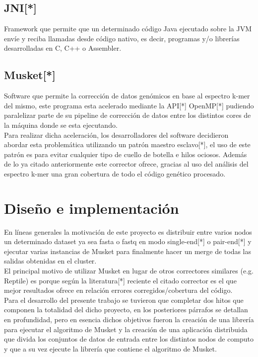 \documentclass[conference]{IEEEtran}
\begin{document}
\subsection{JNI[*]}
Framework que permite que un determinado código Java ejecutado sobre la JVM envíe y reciba llamadas desde código nativo, es decir, programas y/o librerías desarrolladas en C, C++ o Assembler.

\subsection{Musket[*]}
Software que permite la corrección de datos genómicos en base al espectro k-mer del mismo, este programa esta acelerado mediante la API[*] OpenMP[*] pudiendo paralelizar parte de su pipeline de corrección de datos entre los distintos cores de la máquina donde se esta ejecutando.\\
Para realizar dicha aceleración, los desarrolladores del software decidieron abordar esta problemática utilizando un patrón maestro esclavo[*], el uso de este patrón es para evitar cualquier tipo de cuello de botella e hilos ociosos. Además de lo ya citado anteriormente este corrector ofrece, gracias al uso del análisis del espectro k-mer una gran cobertura de todo el código genético procesado.

\section{Diseño e implementación}

En líneas generales la motivación de este proyecto es distribuir entre varios nodos un determinado dataset ya sea fasta o fastq en modo single-end[*] o pair-end[*] y ejecutar varias instancias de Musket para finalmente hacer un merge de todas las salidas obtenidas en el cluster.\\
El principal motivo de utilizar Musket en lugar de otros correctores similares (e.g. Reptile) es porque según la literatura[*] reciente el citado corrector es el que mejor resultados ofrece en relación errores corregidos/cobertura del código.\\

Para el desarrollo del presente trabajo se tuvieron que completar dos hitos que componen la totalidad del dicho proyecto, en los posteriores párrafos se detallan en profundidad, pero en esencia dichos objetivos fueron la creación de una librería para ejecutar el algoritmo de Musket y la creación de una aplicación distribuida que divida los conjuntos de datos de entrada entre los distintos nodos de computo y que a su vez ejecute la librería que contiene el algoritmo de Musket.\\
\end{document}
